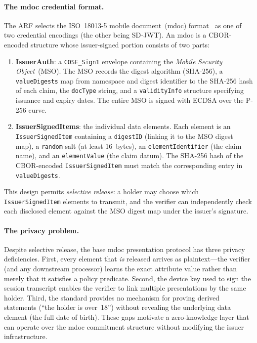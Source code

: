 \paragraph{The mdoc credential format.}
The ARF selects the ISO~18013-5 mobile document~(mdoc) format~\cite{iso18013}
as one of two credential encodings (the other being SD-JWT).  An mdoc is a
CBOR-encoded structure whose issuer-signed portion consists of two parts:
\begin{enumerate}[label=(\roman*)]
  \item \textbf{IssuerAuth}: a \texttt{COSE\_Sign1} envelope containing the
        \emph{Mobile Security Object}~(MSO).  The MSO records the digest
        algorithm (SHA-256), a \texttt{valueDigests} map from namespace and
        digest identifier to the SHA-256 hash of each claim, the
        \texttt{docType} string, and a \texttt{validityInfo} structure
        specifying issuance and expiry dates.  The entire MSO is signed with
        ECDSA over the P-256 curve.
  \item \textbf{IssuerSignedItems}: the individual data elements.  Each element
        is an \texttt{IssuerSignedItem} containing a \texttt{digestID} (linking
        it to the MSO digest map), a \texttt{random} salt (at least 16~bytes),
        an \texttt{elementIdentifier} (the claim name), and an
        \texttt{elementValue} (the claim datum).  The SHA-256 hash of the
        CBOR-encoded \texttt{IssuerSignedItem} must match the corresponding
        entry in \texttt{valueDigests}.
\end{enumerate}
This design permits \emph{selective release}: a holder may choose which
\texttt{IssuerSignedItem} elements to transmit, and the verifier can
independently check each disclosed element against the MSO digest map under
the issuer's signature.

\paragraph{The privacy problem.}
Despite selective release, the base mdoc presentation protocol has three
privacy deficiencies.  First, every element that \emph{is} released arrives as
plaintext---the verifier (and any downstream processor) learns the exact
attribute value rather than merely that it satisfies a policy predicate.
Second, the device key used to sign the session transcript enables the verifier
to link multiple presentations by the same holder.  Third, the standard
provides no mechanism for proving derived statements (``the holder is over~18'')
without revealing the underlying data element (the full date of birth).  These
gaps motivate a zero-knowledge layer that can operate over the mdoc commitment
structure without modifying the issuer infrastructure.

